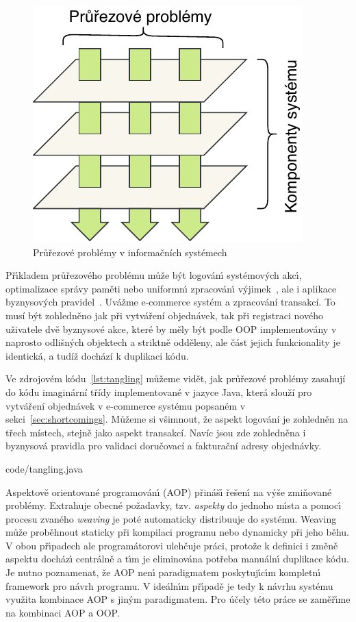 \begin{figure}[t]
    \centering
    \includegraphics[keepaspectratio=true, width=0.35\linewidth]{figures/cross-cutting.pdf}
    \caption{Průřezové problémy v informačních systémech}
    \label{fig:cross-cutting}
\end{figure}

Př\'{\i}kladem průřezového problému může b\'yt logován\'{\i}
systémov\'ych akc\'{\i}, optimalizace správy paměti
nebo uniformn\'{\i} zpracován\'{\i} v\'yjimek~\cite{kiczales1997aspect},
ale i aplikace byznysových pravidel~\cite{cemus2014aspect}.
Uvážme e-commerce systém a zpracování transakcí. To musí
být zohledněno jak při vytváření objednávek, tak při registraci
nového uživatele \textendash dvě byznysové akce, které by měly
být podle \gls{OOP} implementovány v naprosto odlišných objektech
a striktně odděleny, ale část jejich funkcionality je identická,
a tudíž dochází k duplikaci kódu.

Ve zdrojovém kódu~\ref{lst:tangling} můžeme vidět, jak průřezové
problémy zasahují do kódu imaginární třídy implementované v
jazyce Java, která slouží pro vytváření objednávek v e-commerce
systému popsaném v sekci~\ref{sec:shortcomings}.
Můžeme si všimnout, že aspekt logování je zohledněn na třech
místech, stejně jako aspekt transakcí. Navíc jsou zde zohledněna
i byznysová pravidla pro validaci doručovací a fakturační adresy
objednávky.


{code/tangling.java}

Aspektově orientované programován\'{\i} (\gls{AOP}) přináš\'{\i} řešen\'{\i} na
v\'yše zmiňované problémy. Extrahuje obecné požadavky,
tzv. \textit{aspekty} do jednoho m\'{\i}sta a pomoc\'{\i} procesu zvaného
\textit{weaving} je poté automaticky distribuuje do systému.
Weaving může proběhnout staticky při kompilaci programu nebo dynamicky
při jeho běhu. V obou př\'{\i}padech ale programátorovi ulehčuje práci,
protože k definici i změně aspektu docház\'{\i} centrálně a t\'{\i}m je eliminována
potřeba manuáln\'{\i} duplikace kódu. Je nutno poznamenat, že \gls{AOP} nen\'{\i}
paradigmatem poskytuj\'{\i}c\'{\i}m kompletn\'{\i} framework pro návrh programu.
V ideáln\'{\i}m př\'{\i}padě je tedy k návrhu systému využita kombinace
\gls{AOP} s jin\'ym paradigmatem. Pro účely této práce se zaměř\'{\i}me na
kombinaci \gls{AOP} a \gls{OOP}.


